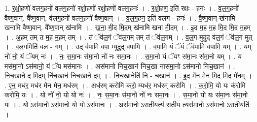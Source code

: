 \documentclass[17pt]{extarticle}
\begin{document}
1. र॒क्षो॒हणो॑ वलग॒हनो॑ वलग॒हनो॑ रक्षो॒हणो॑ रक्षो॒हणो॑ वलग॒हनः॑ । . र॒क्षो॒हण॒ इति॑ रक्षः - हनः॑ । . व॒ल॒ग॒हनो॑ वैष्ण॒वान्. वै᳚ष्ण॒वान्. व॑लग॒हनो॑ वलग॒हनो॑ वैष्ण॒वान् । . व॒ल॒ग॒हन॒ इति॑ वलग - हनः॑ । . वै॒ष्ण॒वान् ख॑नामि खनामि वैष्ण॒वान्. वै᳚ष्ण॒वान् ख॑नामि । . ख॒ना॒ मी॒द मि॒दम् ख॑नामि खना मी॒दम् । . इ॒द म॒ह म॒ह मि॒द मि॒द म॒हम् । . अ॒हम् तम् त म॒ह म॒हम् तम् । . तं ॅव॑ल॒गं ॅव॑ल॒गम् तम् तं ॅव॑ल॒गम् । . व॒ल॒ग मुदुद् व॑ल॒गं ॅव॑ल॒ग मुत् । . व॒ल॒गमिति॑ वल - गम् । . उद् व॑पामि वपा॒ म्युदुद् व॑पामि । . व॒पा॒मि॒ यं ॅयं ॅव॑पामि वपामि॒ यम् । . यम् नो॑ नो॒ यं ॅयम् नः॑ । . नः॒ स॒मा॒नः स॑मा॒नो नो॑ नः समा॒नः । . स॒मा॒नो यं ॅयꣳ स॑मा॒नः स॑मा॒नो यम् । . य मस॑मा॒नो ऽस॑मानो॒ यं ॅय मस॑मानः । . अस॑मानो निच॒खान॑ निच॒खा नास॑मा॒नो ऽस॑मानो निच॒खान॑ । . नि॒च॒खाने॒ द मि॒दम् नि॑च॒खान॑ निच॒खाने॒ दम् । . नि॒च॒खानेति॑ नि - च॒खान॑ । . इ॒द मे॑न मेन मि॒द मि॒द मे॑नम् । . ए॒न॒ मध॑र॒ मध॑र मेन मेन॒ मध॑रम् । . अध॑रम् करोमि करो॒ म्यध॑र॒ मध॑रम् करोमि । . क॒रो॒मि॒ यो यः क॑रोमि करोमि॒ यः । . यो नो॑ नो॒ यो यो नः॑ । . नः॒ स॒मा॒नः स॑मा॒नो नो॑ नः समा॒नः । . स॒मा॒नो यो यः स॑मा॒नः स॑मा॒नो यः । . यो ऽस॑मा॒नो ऽस॑मानो॒ यो यो ऽस॑मानः । . अस॑मानो ऽराती॒यत्य॑ राती॒य त्यस॑मा॒नो ऽस॑मानो ऽराती॒यति॑ । \newline
\end{document}
